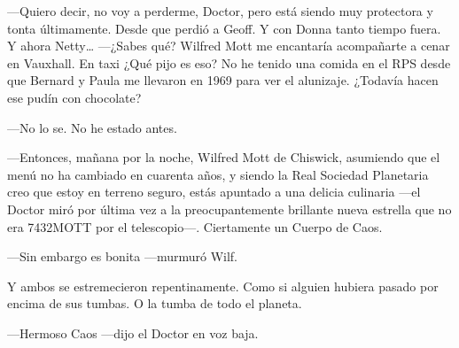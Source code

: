 ---Quiero decir, no voy a perderme, Doctor, pero está siendo muy
protectora y tonta últimamente. Desde que perdió a Geoff. Y con Donna
tanto tiempo fuera. Y ahora Netty\ldots{} ---¿Sabes qué? Wilfred Mott
me encantaría acompañarte a cenar en Vauxhall. En taxi ¿Qué pijo es
eso? No he tenido una comida en el RPS desde que Bernard y Paula me
llevaron en 1969 para ver el alunizaje. ¿Todavía hacen ese pudín con
chocolate?

---No lo se. No he estado antes.

---Entonces, mañana por la noche, Wilfred Mott de Chiswick, asumiendo
que el menú no ha cambiado en cuarenta años, y siendo la Real Sociedad
Planetaria creo que estoy en terreno seguro, estás apuntado a una
delicia culinaria ---el Doctor miró por última vez a la preocupantemente
brillante nueva estrella que no era 7432MOTT por el telescopio---.
Ciertamente un Cuerpo de Caos.

---Sin embargo es bonita ---murmuró Wilf.

Y ambos se estremecieron repentinamente. Como si alguien hubiera pasado
por encima de sus tumbas. O la tumba de todo el planeta.

---Hermoso Caos ---dijo el Doctor en voz baja.

